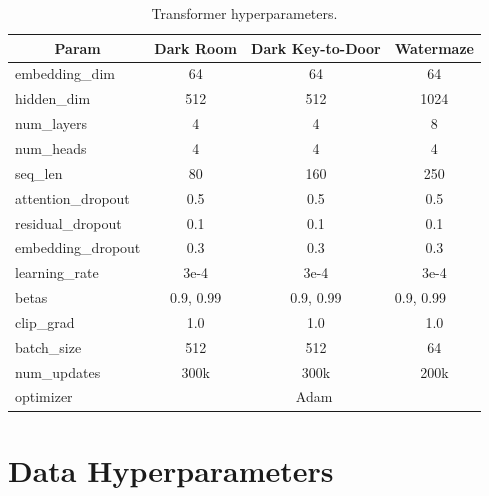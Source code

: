 \documentclass{article}
\theoremstyle{plain}
\theoremstyle{definition}
\theoremstyle{remark}
\begin{document}
\begin{table}[h!]
\centering
\begin{tabular}{@{}lccc@{}}
\toprule
\multicolumn{1}{c}{\textbf{Param}} & \multicolumn{1}{l}{\textbf{Dark Room}} & \textbf{Dark Key-to-Door} & \multicolumn{1}{l}{\textbf{Watermaze}} \\ \midrule
embedding\_dim     & 64     & 64     & 64     \\
hidden\_dim        & 512    & 512    & 1024   \\
num\_layers        & 4      & 4      & 8      \\
num\_heads         & 4      & 4      & 4      \\
seq\_len           & 80     & 160    & 250    \\
attention\_dropout & 0.5    & 0.5    & 0.5    \\
residual\_dropout  & 0.1    & 0.1    & 0.1    \\
embedding\_dropout & 0.3    & 0.3    & 0.3    \\ \midrule
learning\_rate     & 3e-4   & 3e-4   & 3e-4   \\
betas                              & 0.9, 0.99                              & 0.9, 0.99                 & \multicolumn{1}{l}{0.9, 0.99}          \\
clip\_grad         & 1.0    & 1.0    & 1.0    \\
batch\_size        & 512    & 512    & 64     \\
num\_updates       & 300k   & 300k   & 200k   \\
optimizer          & \multicolumn{3}{c}{Adam} \\ \bottomrule
\end{tabular}
\caption{Transformer hyperparameters.}
\label{tab:hyp-model}
\end{table}

\section{Data Hyperparameters}
\label{apndx:data_hyper}
\end{document}
